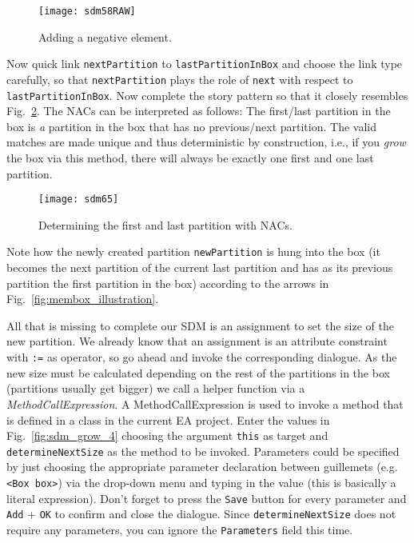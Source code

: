 \begin{figure}[htbp]
\begin{center}
  \texttt{[image: sdm58RAW]}
  \caption{Adding a negative element.}  
  \label{fig:sdm_grow_2}
\end{center}
\end{figure}
 
Now quick link \texttt{nextPartition} to \texttt{lastPartitionInBox} and choose the link type carefully, so that \texttt{nextPartition} plays the role of
\texttt{next} with respect to \texttt{lastPartitionInBox}. Now complete the story pattern so that it closely resembles Fig.~\ref{fig:sdm_grow_3}. The
\mbox{NACs} can be interpreted as follows:  The first/last partition in the box is \emph{a} partition in the box that has no previous/next partition.
The valid matches are made unique and thus deterministic by construction, i.e., if you \emph{grow} the box via this method, there will always be exactly one
first and one last partition.

\begin{figure}[htbp]
\begin{center}
  \texttt{[image: sdm65]} 
  \caption{Determining the first and last partition with NACs.}  
  \label{fig:sdm_grow_3}
\end{center}
\end{figure}
 
Note how the newly created partition \texttt{newPartition} is hung into the box (it becomes the next partition of the current last partition and has as its
previous partition the first partition in the box) according to the arrows in Fig.~\ref{fig:membox_illustration}.
  
All that is missing to complete our SDM is an assignment to set the size of the new partition. We already know that an assignment is an attribute constraint
with \texttt{:=} as operator, so go ahead and invoke the corresponding dialogue. As the new size must be calculated depending on the rest of the partitions in
the box (partitions usually get bigger) we call a helper function  via a \emph{MethodCallExpression}. A MethodCallExpression is used
to invoke a method that is defined in a class in the current EA project. Enter the values in Fig.~\ref{fig:sdm_grow_4} choosing the argument \texttt{this} as
target and \texttt{determineNextSize} as the method to be invoked.
Parameters could be specified by just choosing the appropriate parameter declaration between guillemets (e.g. \texttt{<Box box>}) via the drop-down menu and
typing in the value (this is basically a literal expression). Don't forget to press the \texttt{Save} button for every parameter and \texttt{Add} + \texttt{OK}
to confirm and close the dialogue. Since \texttt{determineNextSize} does not require any parameters, you can ignore the \texttt{Parameters} field this time.
 
